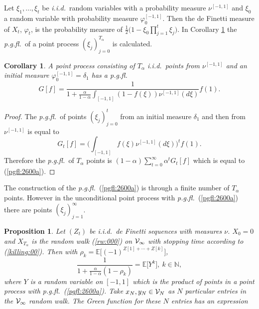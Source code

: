 \documentclass[preprint,11pt]{elsarticle}
\newtheorem{Corollary}{Corollary}
\newtheorem{Proposition}{Proposition}
\theoremstyle{remark}
\def\spin{{[-1,1]}}
\def\pgfl{\emph{p.g.fl.~}}
\def\iid{\emph{i.i.d.}~}
\begin{document}
{Let $\xi_1,\ldots, \xi_t$ be \iid random variables with a probability measure $\nu^\spin$ and $\xi_0$ a random variable with probability measure $\varphi_0^\spin$. Then the de Finetti measure of $X_t$, $\varphi_t$, is the probability measure of
$\frac{1}{2}\big ( 1 - \xi_0\prod_{j=1}^t\xi_j\big )$.
In Corollary \ref{pgflcorr} the \pgfl of a point process
$(\xi_j)_{j=0}^{T_\alpha}$ is calculated. 
%
\begin{Corollary}\label{pgflcorr}
A point process consisting of $T_\alpha$ \iid points from $\nu^\spin$ and an initial measure $\varphi_0^\spin = \delta_1$ has a \pgfl
\begin{equation}
G[f] 
=  \frac{1}{1+\frac{\alpha}{1-\alpha}\int_{[-1,1]}(1-f(\xi))\nu^\spin(d\xi)}f(1).
\label{pgfl:2600a}
\end{equation}
\end{Corollary}
%
\begin{proof}
The \pgfl of points $(\xi_j)_{j=0}^{t}$ from an initial measure $\delta_1$ and then from $\nu^\spin$ is equal to
\[
G_t[f] = \Big (\int_\spin f(\xi)\nu^\spin(d\xi)\Big )^tf(1).
\]
Therefore the \pgfl of $T_\alpha$ points  is $(1-\alpha)\sum_{t=0}^\infty\alpha^t G_t[f]$ which is equal to (\ref{pgfl:2600a}).
\end{proof}
The construction of the \pgfl  (\ref{pgfl:2600a}) is through a finite number of $T_\alpha$ points. However in the unconditional point process with \pgfl (\ref{pgfl:2600a}) there are points $(\xi_j)_{j=1}^\infty$.
\begin{Proposition}\label{propde:90}
Let $(Z_t)$ be \iid  de Finetti sequences with measures $\nu$. $X_0=0$ and $X_{T_\alpha}$ is the random walk (\ref{rw:000}) on ${\cal V}_\infty$ with stopping time according to (\ref{killing:00}). Then with $\rho_k=\mathbb{E}\big [(-1)^{Z[1]+\cdots + Z[k]}\big ]$,
\begin{equation}
\frac{1}{1 + \frac{\alpha}{1-\alpha}(1-\rho_k)} = \mathbb{E}\big [Y^k\big ],\ k \in \mathbb{N},
\label{YYY:000}
\end{equation}
where $Y$ is a random variable on $[-1,1]$ which is the product of points in a point process with \pgfl (\ref{pgfl:2600a}).
%
Take $x_N,y_N \in {\cal V}_N$ as $N$ particular entries in the ${\cal V}_\infty$ random walk. The Green function for these $N$ entries has an expression
\begin{equation}

\end{equation}
\end{Proposition}}
\end{document}
